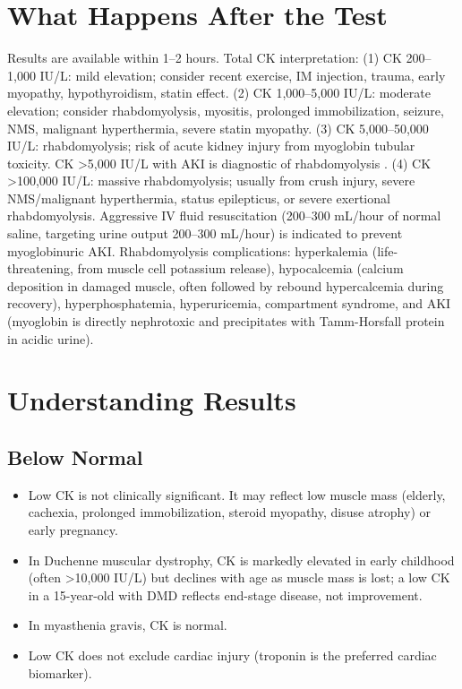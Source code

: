 \section*{What Happens After the Test}
Results are available within 1--2 hours. Total CK interpretation: (1) CK 200--1,000 IU/L: mild elevation; consider recent exercise, IM injection, trauma, early myopathy, hypothyroidism, statin effect. (2) CK 1,000--5,000 IU/L: moderate elevation; consider rhabdomyolysis, myositis, prolonged immobilization, seizure, NMS, malignant hyperthermia, severe statin myopathy. (3) CK 5,000--50,000 IU/L: rhabdomyolysis; risk of acute kidney injury from myoglobin tubular toxicity. CK >5,000 IU/L with AKI is diagnostic of rhabdomyolysis \cite{zimmerman2013rhabdomyolysis}. (4) CK >100,000 IU/L: massive rhabdomyolysis; usually from crush injury, severe NMS/malignant hyperthermia, status epilepticus, or severe exertional rhabdomyolysis. Aggressive IV fluid resuscitation (200--300 mL/hour of normal saline, targeting urine output 200--300 mL/hour) is indicated to prevent myoglobinuric AKI. Rhabdomyolysis complications: hyperkalemia (life-threatening, from muscle cell potassium release), hypocalcemia (calcium deposition in damaged muscle, often followed by rebound hypercalcemia during recovery), hyperphosphatemia, hyperuricemia, compartment syndrome, and AKI (myoglobin is directly nephrotoxic and precipitates with Tamm-Horsfall protein in acidic urine).

\section*{Understanding Results}

\subsection*{Below Normal}
\begin{itemize}
  \item Low CK is not clinically significant. It may reflect low muscle mass (elderly, cachexia, prolonged immobilization, steroid myopathy, disuse atrophy) or early pregnancy.
  \item In Duchenne muscular dystrophy, CK is markedly elevated in early childhood (often >10,000 IU/L) but declines with age as muscle mass is lost; a low CK in a 15-year-old with DMD reflects end-stage disease, not improvement.
  \item In myasthenia gravis, CK is normal.
  \item Low CK does not exclude cardiac injury (troponin is the preferred cardiac biomarker).
\end{itemize}

